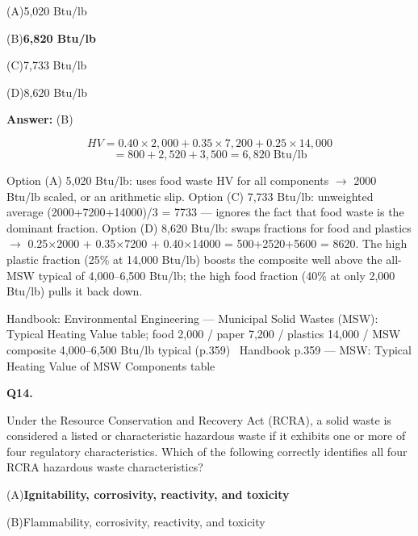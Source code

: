 \documentclass[11pt]{article}
\newcommand{\correct}[1]{\textbf{#1}\;{\color{accent}$\checkmark$}}
\newcommand{\optline}[2]{\par\noindent\hspace{1.2em}(#1)\hspace{0.6em}#2}
\begin{document}
\optline{A}{5,020 Btu/lb}
\optline{B}{\correct{6,820 Btu/lb}}
\optline{C}{7,733 Btu/lb}
\optline{D}{8,620 Btu/lb}
\par\vspace{3pt}
\vspace{2pt}\par\noindent\colorbox{boxbg}{\parbox{\dimexpr\linewidth-2\fboxsep\relax}{%
\vspace{2pt}\textbf{Answer:} (B)\par\vspace{2pt}
{\small \[HV = 0.40 \times 2{,}000 + 0.35 \times 7{,}200 + 0.25 \times 14{,}000\]
\[= 800 + 2{,}520 + 3{,}500 = 6{,}820\;\text{Btu/lb}\]

Option (A) 5,020 Btu/lb: uses food waste HV for all components $\rightarrow$ 2000 Btu/lb scaled, or an arithmetic slip. Option (C) 7,733 Btu/lb: unweighted average (2000+7200+14000)/3 = 7733 --- ignores the fact that food waste is the dominant fraction. Option (D) 8,620 Btu/lb: swaps fractions for food and plastics $\rightarrow$ 0.25$\times$2000 + 0.35$\times$7200 + 0.40$\times$14000 = 500+2520+5600 = 8620. The high plastic fraction (25\% at 14,000 Btu/lb) boosts the composite well above the all-MSW typical of 4,000--6,500 Btu/lb; the high food fraction (40\% at only 2,000 Btu/lb) pulls it back down.}\par\vspace{2pt}
{\footnotesize\color{soft}Handbook: Environmental Engineering --- Municipal Solid Wastes (MSW): Typical Heating Value table; food 2,000 / paper 7,200 / plastics 14,000 / MSW composite 4,000--6,500 Btu/lb typical (p.359) \textbullet\ Handbook p.359 --- MSW: Typical Heating Value of MSW Components table}\vspace{2pt}
}}
\vspace{9pt}
\filbreak
\textbf{\color{accent}Q14.}\par\vspace{2pt}
Under the Resource Conservation and Recovery Act (RCRA), a solid waste is considered a listed or characteristic hazardous waste if it exhibits one or more of four regulatory characteristics. Which of the following correctly identifies all four RCRA hazardous waste characteristics?\par\vspace{3pt}
\optline{A}{\correct{Ignitability, corrosivity, reactivity, and toxicity}}
\optline{B}{Flammability, corrosivity, reactivity, and toxicity}
\end{document}
